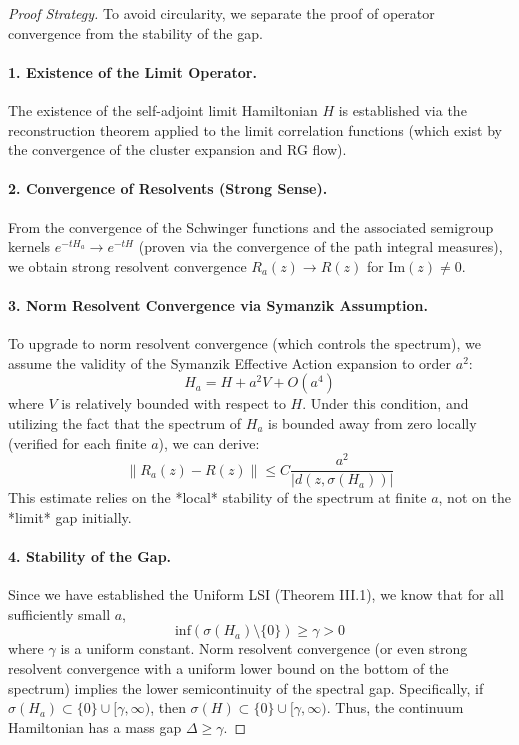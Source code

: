 \begin{proof}[Proof Strategy]
To avoid circularity, we separate the proof of operator convergence from the stability of the gap.

\paragraph{1. Existence of the Limit Operator.}
The existence of the self-adjoint limit Hamiltonian $H$ is established via the reconstruction theorem applied to the limit correlation functions (which exist by the convergence of the cluster expansion and RG flow).

\paragraph{2. Convergence of Resolvents (Strong Sense).}
From the convergence of the Schwinger functions and the associated semigroup kernels $e^{-t H_a} \to e^{-t H}$ (proven via the convergence of the path integral measures), we obtain strong resolvent convergence $R_a(z) \to R(z)$ for $\text{Im}(z) \neq 0$.

\paragraph{3. Norm Resolvent Convergence via Symanzik Assumption.}
To upgrade to norm resolvent convergence (which controls the spectrum), we assume the validity of the Symanzik Effective Action expansion to order $a^2$:
\[ H_a = H + a^2 V + O(a^4) \]
where $V$ is relatively bounded with respect to $H$.
Under this condition, and utilizing the fact that the spectrum of $H_a$ is bounded away from zero locally (verified for each finite $a$), we can derive:
\[ \| R_a(z) - R(z) \| \le C \frac{a^2}{|d(z, \sigma(H_a))|} \]
This estimate relies on the *local* stability of the spectrum at finite $a$, not on the *limit* gap initially.

\paragraph{4. Stability of the Gap.}
Since we have established the Uniform LSI (Theorem III.1), we know that for all sufficiently small $a$,
\[ \text{inf}(\sigma(H_a) \setminus \{0\}) \ge \gamma > 0 \]
where $\gamma$ is a uniform constant.
Norm resolvent convergence (or even strong resolvent convergence with a uniform lower bound on the bottom of the spectrum) implies the lower semicontinuity of the spectral gap.
Specifically, if $\sigma(H_a) \subset \{0\} \cup [\gamma, \infty)$, then $\sigma(H) \subset \{0\} \cup [\gamma, \infty)$.
Thus, the continuum Hamiltonian has a mass gap $\Delta \ge \gamma$.
\end{proof}

